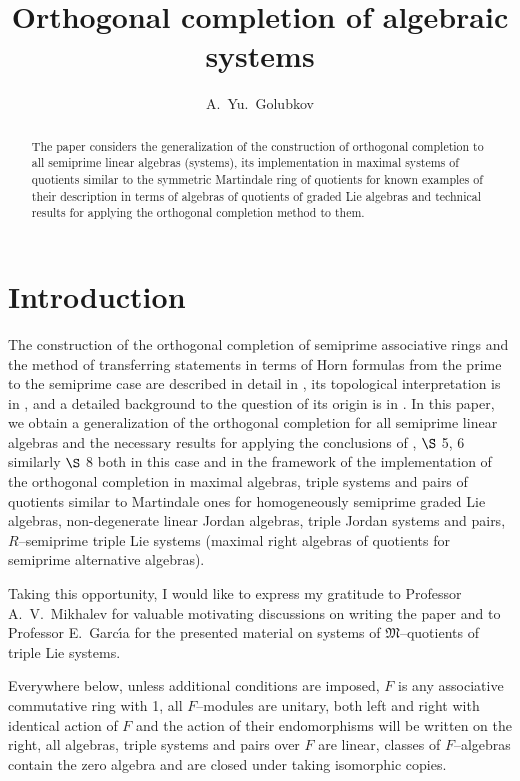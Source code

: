 \documentclass[a4paper,11pt]{article}
\begin{document}
\date{}

\title{Orthogonal completion of algebraic systems} 

\author{A.~Yu.~Golubkov}

\maketitle

\begin{abstract} 
The paper considers the generalization of the construction of orthogonal 
completion to all semiprime linear algebras (systems), its implementation 
in maximal systems of quotients similar to the symmetric Martindale ring 
of quotients for known examples of their description in terms of algebras 
of quotients of graded Lie algebras and technical results for 
applying the orthogonal completion method to them.
\end{abstract}

\section{Introduction}

The construction of the orthogonal completion of semiprime associative rings 
and the method of transferring statements in terms of Horn formulas from the 
prime to the semiprime case are described in detail in \cite{B6, BMich, BMM}, 
its topological interpretation is in \cite{Har2}, and a detailed background to 
the question of its origin is in \cite{BMich}. In this paper, we obtain a 
generalization of the orthogonal completion for all semiprime linear algebras 
and the necessary results for applying the conclusions of \cite{BMich}, 
$\S$ 5, 6 similarly $\S$ 8 both in this case and in the framework of the 
implementation of the orthogonal completion in maximal algebras, triple systems 
and pairs of quotients similar to Martindale ones for homogeneously semiprime 
graded Lie algebras, non-degenerate linear Jordan algebras, triple Jordan 
systems and pairs, $R$--semiprime triple Lie systems (maximal right algebras of 
quotients for semiprime alternative algebras). 

Taking this opportunity, I would like to express my gratitude to Professor 
A.~V.~Mikhalev for valuable motivating discussions on writing the paper and 
to Professor E.~Garc{\'\i}a for the presented material on systems of 
$\mathfrak{M}$--quotients of triple Lie systems.

Everywhere below, unless additional conditions are imposed, $F$ is any 
associative commutative ring with 1, all $F$--modules are unitary, 
both left and right with identical action of $F$ and the action of their 
endomorphisms will be written on the right, all algebras, triple systems 
and pairs over $F$ are linear, classes of $F$--algebras contain the zero 
algebra and are closed under taking isomorphic copies.
\end{document}
